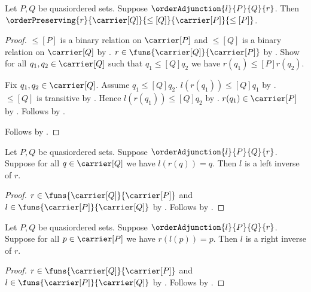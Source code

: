 \begin{proposition}\label{order_adjunction_right_order_preserving}
    Let $P,Q$ be quasiordered sets.
    Suppose $\orderAdjunction{l}{P}{Q}{r}$.
    Then $\orderPreserving{r}{\carrier[Q]}{\leq[Q]}
        {\carrier[P]}{\leq[P]}$.
\end{proposition}
\begin{proof}
    $\leq[P]$ is a binary relation on $\carrier[P]$ and
        $\leq[Q]$ is a binary relation on $\carrier[Q]$ by
        .
    $r\in\funs{\carrier[Q]}{\carrier[P]}$ by
        .
    Show for all $q_1,q_2\in\carrier[Q]$ such that
        $q_1\mathrel{\leq[Q]}q_2$ we have
        $r(q_1)\mathrel{\leq[P]}r(q_2)$.
    \begin{subproof}
        Fix $q_1,q_2\in\carrier[Q]$.
        Assume $q_1\mathrel{\leq[Q]}q_2$.
        $l(r(q_1))\mathrel{\leq[Q]}q_1$ by
            .
        $\leq[Q]$ is transitive by .
        Hence $l(r(q_1))\mathrel{\leq[Q]}q_2$ by
            .
        $r(q_1)\in\carrier[P]$ by .
        Follows by .
    \end{subproof}
    Follows by .
\end{proof}

\begin{proposition}\label{order_adjunction_counit_identity_leftinverse}
    Let $P,Q$ be quasiordered sets.
    Suppose $\orderAdjunction{l}{P}{Q}{r}$.
    Suppose for all $q\in\carrier[Q]$ we have $l(r(q))=q$.
    Then $l$ is a left inverse of $r$.
\end{proposition}
\begin{proof}
    $r\in\funs{\carrier[Q]}{\carrier[P]}$ and
        $l\in\funs{\carrier[P]}{\carrier[Q]}$ by
        .
    Follows by .
\end{proof}

\begin{proposition}\label{order_adjunction_unit_identity_rightinverse}
    Let $P,Q$ be quasiordered sets.
    Suppose $\orderAdjunction{l}{P}{Q}{r}$.
    Suppose for all $p\in\carrier[P]$ we have $r(l(p))=p$.
    Then $l$ is a right inverse of $r$.
\end{proposition}
\begin{proof}
    $r\in\funs{\carrier[Q]}{\carrier[P]}$ and
        $l\in\funs{\carrier[P]}{\carrier[Q]}$ by
        .
    Follows by .
\end{proof}

